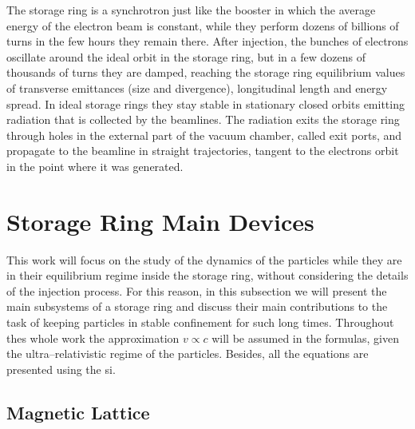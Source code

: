     The storage ring is a synchrotron just like the booster in which the average energy of the electron beam is constant, while they perform dozens of billions of turns in the few hours they remain there. After injection, the bunches of electrons oscillate around the ideal orbit in the storage ring, but in a few dozens of thousands of turns they are damped, reaching the storage ring equilibrium values of transverse emittances (size and divergence), longitudinal length and energy spread. In ideal storage rings they stay stable in stationary closed orbits emitting radiation that is collected by the beamlines. The radiation exits the storage ring through holes in the external part of the vacuum chamber, called exit ports, and propagate to the beamline in straight trajectories, tangent to the electrons orbit in the point where it was generated.

\section{Storage Ring Main Devices} \label{sec:storage_ring_main_devices}

    This work will focus on the study of the dynamics of the particles while they are in their equilibrium regime inside the storage ring, without considering the details of the injection process. For this reason, in this subsection we will present the main subsystems of a storage ring and discuss their main contributions to the task of keeping particles in stable confinement for such long times. Throughout thes whole work the approximation $v\propto c$ will be assumed in the formulas, given the ultra--relativistic regime of the particles. Besides, all the equations are presented using the \gls{si}.

\subsection{Magnetic Lattice}


